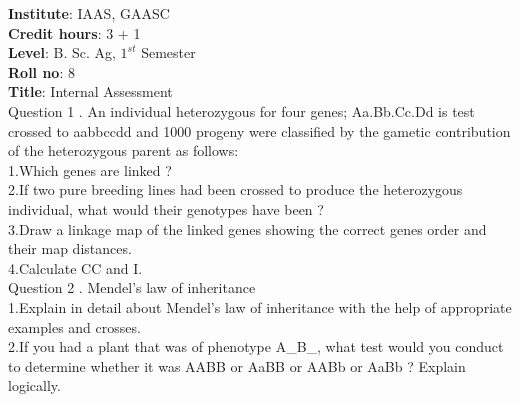 \documentclass[12pt]{article}\usepackage[]{graphicx}\usepackage[]{color}
\begin{document}
{            \textbf{Institute}: IAAS, GAASC \\}\textbf{Credit hours}: 3 + 1 \\\textbf{Level}: B. Sc. Ag, $1^{st}$ Semester \\\textbf{Roll no}: 8 \\\textbf{Title}: Internal Assessment \\[1cm]Question 1 . An individual heterozygous for four genes; Aa.Bb.Cc.Dd is test crossed to aabbccdd and 1000 progeny were classified by the gametic contribution of the heterozygous parent as follows: \\\hspace{0.5cm}1.Which genes are linked ?\\\hspace{0.5cm}2.If two pure breeding lines had been crossed to produce the heterozygous individual, what would their genotypes have been ?\\\hspace{0.5cm}3.Draw a linkage map of the linked genes showing the correct genes order and their map distances.\\\hspace{0.5cm}4.Calculate CC and I.\\Question 2 . Mendel's law of inheritance \\\hspace{0.5cm}1.Explain in detail about Mendel's law of inheritance with the help of appropriate examples and crosses.\\\hspace{0.5cm}2.If you had a plant that was of phenotype A\_B\_, what test would you conduct to determine whether it was AABB or AaBB or AABb or AaBb ? Explain logically.\\
\end{document}
